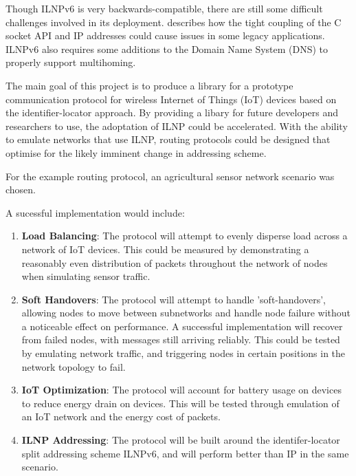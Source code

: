 \documentclass[12pt]{article}
\begin{document}
Though ILNPv6 is very backwards-compatible, there are still some difficult challenges involved in its deployment. \cite{ipwithoutip} describes how the tight coupling of the C socket API and IP addresses could cause issues in some legacy applications. ILNPv6 also requires some additions to the Domain Name System (DNS) to properly support multihoming. 

The main goal of this project is to produce a library for a prototype communication
protocol for wireless Internet of Things (IoT) devices based on the identifier-locator approach. By providing a libary for future developers and researchers to use, the adoptation of ILNP could be accelerated. With the ability to emulate networks that use ILNP, routing protocols could be designed that optimise for the likely imminent change in addressing scheme. 

For the example routing protocol, an agricultural sensor network scenario was chosen. 

\vspace{\baselineskip}
\noindent A sucessful implementation would include:

\begin{enumerate}
	\item \textbf{Load Balancing}: The protocol will attempt to evenly disperse load across a network of IoT
devices. This could be measured by demonstrating a reasonably even distribution of packets throughout the network of nodes when simulating sensor traffic. 
	\item \textbf{Soft Handovers}: The protocol will attempt to handle ’soft-handovers’, allowing nodes to
move between subnetworks and handle node failure without a noticeable effect on performance. A successful implementation will recover from failed nodes, with messages still arriving reliably. This could be tested by emulating network traffic, and triggering nodes in certain positions in the network topology to fail.

	\item \textbf{IoT Optimization}: The protocol will account for battery usage on devices to reduce energy drain
	on devices. This will be tested through emulation of an IoT network and the energy cost of packets.
	\item \textbf{ILNP Addressing}: The protocol will be built around the identifer-locator split addressing scheme ILNPv6, and will perform better than IP in the same scenario.
\end{enumerate}

\pagebreak
\end{document}
